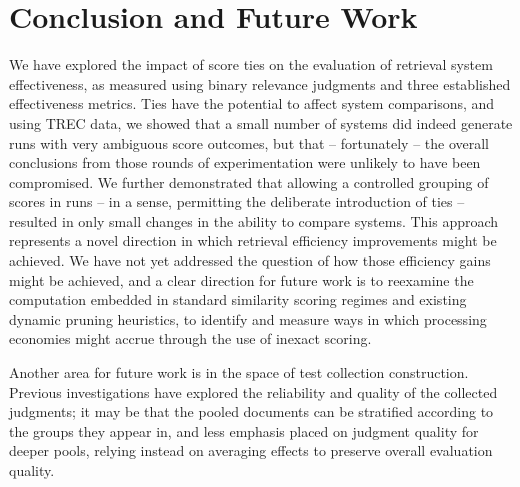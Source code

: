 \section{Conclusion and Future Work}
\label{sec-conclusion}

We have explored the impact of score ties on the evaluation of
retrieval system effectiveness, as measured using binary relevance
judgments and three established effectiveness metrics.
Ties have the potential to affect system comparisons, and using TREC
data, we showed that a small number of systems did indeed generate
runs with very ambiguous score outcomes, but that -- fortunately --
the overall conclusions from those rounds of experimentation were
unlikely to have been compromised.
We further demonstrated that allowing a controlled grouping of scores
in runs -- in a sense, permitting the deliberate introduction of ties
-- resulted in only small changes in the ability to compare systems.
This approach represents a novel direction in which retrieval
efficiency improvements might be achieved.
We have not yet addressed the question of how those efficiency gains
might be achieved, and a clear direction for future work is to
reexamine the computation embedded in standard similarity scoring
regimes and existing dynamic pruning heuristics, to identify and
measure ways in which processing economies might accrue through the
use of inexact scoring.

Another area for future work is in the space of test collection
construction.
Previous investigations
{\citep{voorhees00ipm,bcstvy08sigir,sst11sigir}} have explored the
reliability and quality of the collected judgments; it may be that
the pooled documents can be stratified according to the groups they
appear in, and less emphasis placed on judgment quality for deeper
pools, relying instead on averaging effects to preserve overall
evaluation quality.

